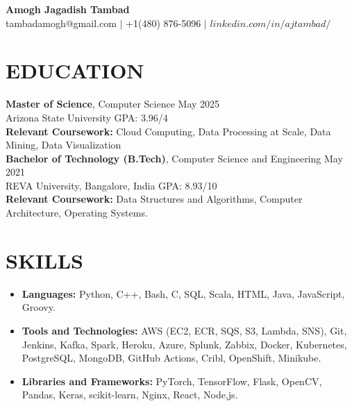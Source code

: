 \documentclass[a4paper,9pt]{extarticle}
\begin{document}
\pagestyle{empty}

\begin{center}
\textbf{\huge Amogh Jagadish Tambad}\\[2pt] %
tambadamogh@gmail.com \hspace{1mm} $|$ \hspace{1mm} +1(480) 876-5096  \hspace{1mm} $|$ \hspace{1mm} $linkedin.com/in/ajtambad/$ \hspace{1mm}
\end{center}

\section*{EDUCATION}
\noindent
\textbf{Master of Science}, Computer Science \hfill May 2025 \\ %
Arizona State University
\hfill GPA: 3.96/4\\ %
\textbf{Relevant Coursework:} Cloud Computing, Data Processing at Scale, Data Mining, Data Visualization\\

\noindent
\textbf{Bachelor of Technology (B.Tech)}, Computer Science and Engineering \hfill May 2021 \\ %
REVA University, Bangalore, India \hfill GPA: 8.93/10\\ %
\textbf{Relevant Coursework:} Data Structures and Algorithms, Computer Architecture, Operating Systems.

\section*{SKILLS}
\begin{itemize}
    \item \textbf{Languages:} Python, C++, Bash, C, SQL, Scala, HTML, Java, JavaScript, Groovy. %
    \item \textbf{Tools and Technologies:} AWS (EC2, ECR, SQS, S3, Lambda, SNS), Git, Jenkins, Kafka, Spark, Heroku, Azure, Splunk, Zabbix, Docker, Kubernetes, PostgreSQL, MongoDB, GitHub Actions, Cribl, OpenShift, Minikube. %
    \item \textbf{Libraries and Frameworks:} PyTorch, TensorFlow, Flask, OpenCV, Pandas, Keras, scikit-learn, Nginx, React, Node,js.
\end{itemize}
\end{document}
